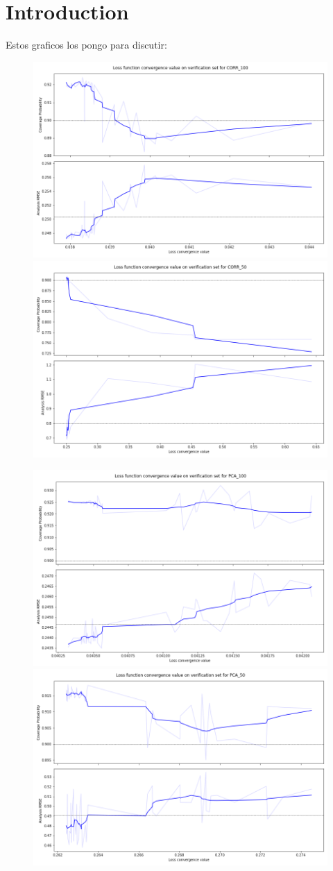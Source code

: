 \documentclass[num-refs]{wiley-article}
\begin{document}
\section{Introduction}
Estos graficos los pongo para discutir:
\begin{figure}[hbt!]
    \centering
        \includegraphics[width=.49\textwidth]{images/tmp/Convergence_CORR_100.png}
        \includegraphics[width=.49\textwidth]{images/tmp/Convergence_CORR_50.png}
\end{figure}
\begin{figure}[hbt!]
    \centering
        \includegraphics[width=.49\textwidth]{images/tmp/Convergence_PCA_100.png}
        \includegraphics[width=.49\textwidth]{images/tmp/Convergence_PCA_50.png}
\end{figure}
\end{document}
